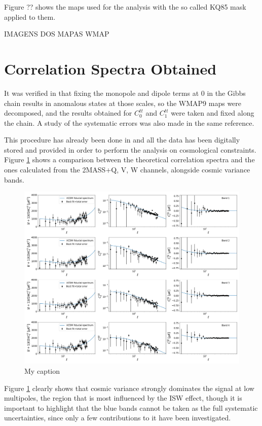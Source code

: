 \documentclass[openany,a4paper,12pt,oneside]{book}
\begin{document}
\begin{spacing}{1.5}
Figure ?? shows the maps used for the analysis with the so called KQ85 mask applied to them.

IMAGENS DOS MAPAS WMAP

\section{Correlation Spectra Obtained}

It was verified in \cite{Moura-Santos_2016} that fixing the monopole and dipole terms at 0 in the Gibbs chain results in anomalous states at those scales, so the WMAP9 maps were decomposed, and the results obtained for $C_0^{tt}$ and $C_1^{tt}$ were taken and fixed along the chain. A study of the systematic errors was also made in the same reference.

This procedure has already been done in \cite{Moura-Santos_2016} and all the data has been digitally stored and provided in order to perform the analysis on cosmological constraints. Figure \ref{fig:correlation_data_final_plots} shows a comparison between the theoretical correlation spectra and the ones calculated from the 2MASS+Q, V, W channels, alongside cosmic variance bands.

\begin{figure}[!htb]
	\centering
	\includegraphics[width=\linewidth]{Imagens/Full_Data_Plot.png}
	\caption{My caption}
	\label{fig:correlation_data_final_plots}
\end{figure}

Figure \ref{fig:correlation_data_final_plots} clearly shows that cosmic variance strongly dominates the signal at low multipoles, the region that is most influenced by the ISW effect, though it is important to highlight that the blue bands cannot be taken as the full systematic uncertainties, since only a few contributions to it have been investigated.


\end{spacing}
\end{document}
